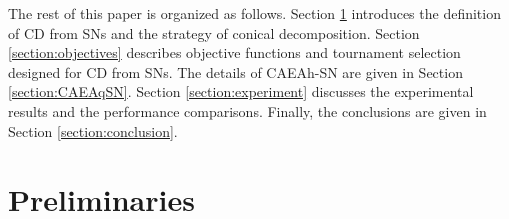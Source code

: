 \documentclass[10pt, journal]{IEEEtran}
\begin{document}


The rest of this paper is organized as follows. Section \ref{section:preliminaries} introduces the definition of CD from SNs and the strategy of conical decomposition. Section \ref{section:objectives} describes objective functions and tournament selection designed for CD from SNs. The details of CAEAh-SN are given in Section \ref{section:CAEAqSN}. Section \ref{section:experiment} discusses the experimental results and the performance comparisons. Finally, the conclusions are given in Section \ref{section:conclusion}.








\section{Preliminaries}\label{section:preliminaries}
\end{document}
